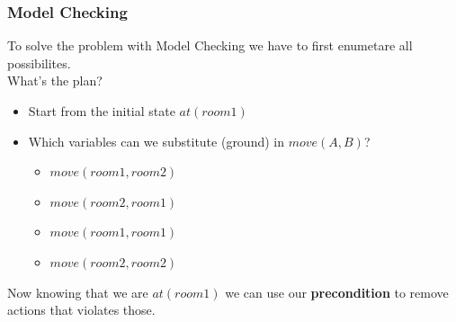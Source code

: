 \subsubsection*{Model Checking}
To solve the problem with Model Checking we have to first enumetare all possibilites.\\
What's the plan?
\begin{itemize}
    \item Start from the initial state $at(room1)$
    \item Which variables can we substitute (ground) in $move(A, B)$?
    \begin{itemize}
        \item $move(room1, room2)$
        \item $move(room2, room1)$
        \item $move(room1, room1)$
        \item $move(room2, room2)$
    \end{itemize}
\end{itemize}

\vspace*{1pt}
Now knowing that we are $at(room1)$ we can use our \textbf{precondition} to remove actions that violates those.\\

